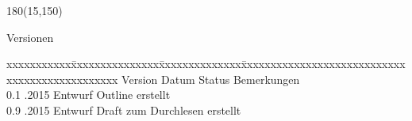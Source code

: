 \begin{textblock}{180}(15,150)
\color{black}
\begin{huge}
Versionen
\end{huge}
\vspace{10mm}

\fontsize{10pt}{18pt}\selectfont
\begin{tabbing}
xxxxxxxxxxx\=xxxxxxxxxxxxxxx\=xxxxxxxxxxxxxx\=xxxxxxxxxxxxxxxxxxxxxxxxxxxxxxxxxxxxxxxxxxxxxxx \kill
Version	\> Datum	\> Status		\> Bemerkungen		\\
0.1	.2015	\> Entwurf		\> Outline erstellt	\\
0.9 .2015   \> Entwurf      \> Draft zum Durchlesen erstellt \\
\end{tabbing}

\end{textblock}
